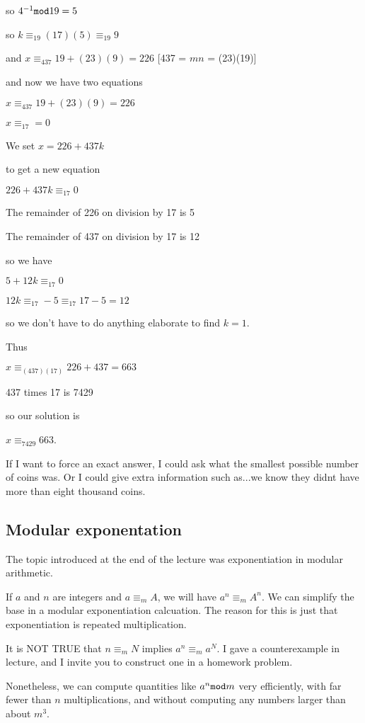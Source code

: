 \documentclass[12pt]{article}
\begin{document}
so $4^{-1}{\tt mod}19 = 5$

so $k \equiv_{19} (17)(5)\equiv_{19} 9$

and $x \equiv_{437} 19+(23)(9) = 226$ [437 = $mn$ = (23)(19)]


and now we have two equations

$x \equiv_{437} 19+(23)(9) = 226$ 

$x \equiv_{17} = 0$

We set $x=226+437k$

to get a new equation

$226+437k\equiv_{17}0$

The remainder of 226 on division by 17 is 5

The remainder of 437 on division by 17 is 12

so we have

$5+12k \equiv_{17}0$

$12k \equiv_{17} -5 \equiv_{17} 17-5 = 12$

so we don't have to do anything elaborate to find $k=1$.

Thus

$x \equiv_{(437)(17)} 226+437 = 663$

437 times 17 is 7429

so our solution is

$x \equiv_{7429} 663$.

If I want to force an exact answer, I could ask what the smallest possible number of coins was.  Or I could give extra information such as...we know they didnt have more than eight thousand coins.

\subsection{Modular exponentation}

The topic introduced at the end of the lecture was exponentiation in modular arithmetic.  

If $a$ and $n$ are integers and $a \equiv_m A$, we will have $a^n \equiv_m A^n$.  We can simplify the base in a modular exponentiation calcuation.  The reason for this is just that exponentiation is repeated multiplication.

It is NOT TRUE that $n \equiv_m N$ implies $a^n \equiv_m a^N$.  I gave a counterexample in lecture, and I invite you to construct one in a homework problem.

Nonetheless, we can compute quantities like $a^n {\tt mod} m$ very efficiently, with far fewer than $n$ multiplications,
and without computing any numbers larger than about $m^3$.
\end{document}
